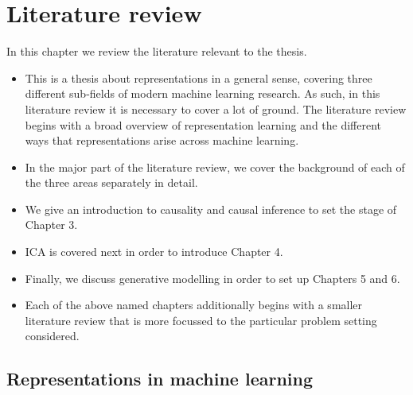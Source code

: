 
\chapter{Literature review}

\ifpdf
    \graphicspath{{Chapter2/Figs/Raster/}{Chapter2/Figs/PDF/}{Chapter2/Figs/}}
\else
    \graphicspath{{Chapter2/Figs/Vector/}{Chapter2/Figs/}}
\fi

In this chapter we review the literature relevant to the thesis.

\begin{itemize}

\item This is a thesis about representations in a general sense, covering three different sub-fields of modern machine learning research. As such, in this literature review it is necessary to cover a lot of ground. The literature review begins with a broad overview of representation learning and the different ways that representations arise across machine learning.
\item In the major part of the literature review, we cover the background of each of the three areas separately in detail.
\item We give an introduction to causality and causal inference to set the stage of Chapter 3.
\item ICA is covered next in order to introduce Chapter 4.
\item Finally, we discuss generative modelling in order to set up Chapters 5 and 6.
\item Each of the above named chapters additionally begins with a smaller literature review that is more focussed to the particular problem setting considered.
\end{itemize}

\section{Representations in machine learning}

